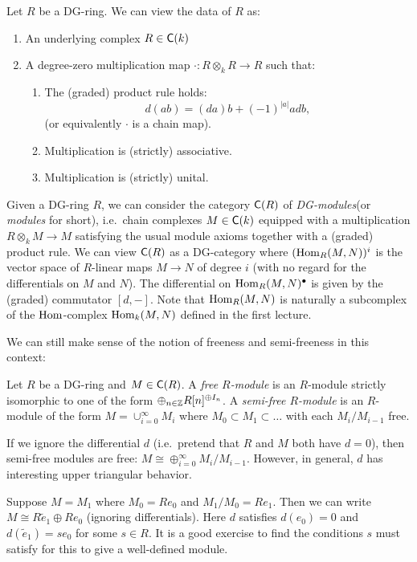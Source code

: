 \documentclass{amsart}
\begin{document}
Let $R$ be a DG-ring.
We can view the data of $R$ as:
\begin{enumerate}
	\item An underlying complex $R \in \mathsf{C}(k)$
	\item A degree-zero multiplication map $\cdot: R \otimes_k R \to R$ such that:
	\begin{enumerate}
		\item The (graded) product rule holds:
		\[
			d(ab) = (da) b + (-1)^{|a|} a db,
		\]
		(or equivalently $\cdot$ is a chain map).
		\item Multiplication is (strictly) associative.
		\item Multiplication is (strictly) unital.
	\end{enumerate}
\end{enumerate}

Given a DG-ring $R$, we can consider the category $\mathsf{C}(R)$ of \emph{DG-modules}(or \emph{modules} for short), i.e.\ chain complexes $M \in \mathsf{C}(k)$ equipped with a multiplication $R \otimes_k M \to M$ satisfying the usual module axioms together with a (graded) product rule.
We can view $\mathsf{C}(R)$ as a DG-category where $(\operatorname{Hom}_R(M, N))^i$ is the vector space of $R$-linear maps $M \to N$ of degree $i$ (with no regard for the differentials on $M$ and $N$).
The differential on $\operatorname{Hom}_R(M, N)^\bullet$ is given by the (graded) commutator $[d, -]$.
Note that $\operatorname{Hom}_R(M, N)$ is naturally a subcomplex of the $\operatorname{Hom}$-complex $\operatorname{Hom}_k(M, N)$ defined in the first lecture.

We can still make sense of the notion of freeness and semi-freeness in this context:

\begin{dfn}
	Let $R$ be a DG-ring and $M \in \mathsf{C}(R)$.
	A \emph{free $R$-module} is an $R$-module strictly isomorphic to one of the form $\oplus_{n \in \mathbb{Z}} R[n]^{\oplus I_n}$.
	A \emph{semi-free $R$-module} is an $R$-module of the form $M = \cup_{i=0}^\infty M_i$ where $M_0 \subset M_1 \subset \dots$ with each $M_i / M_{i-1}$ free.
\end{dfn}

If we ignore the differential $d$ (i.e.\ pretend that $R$ and $M$ both have $d = 0$), then semi-free modules are free: $M \cong \oplus_{i=0}^\infty M_i / M_{i-1}$.
However, in general, $d$ has interesting upper triangular behavior.

\begin{ex}
	Suppose $M = M_1$ where $M_0 = R e_0$ and $M_1 / M_0 = R e_1$.
	Then we can write $M \cong R \tilde{e}_1 \oplus R e_0$ (ignoring differentials).
	Here $d$ satisfies $d(e_0) = 0$ and $d(\tilde{e}_1) = s e_0$ for some $s \in R$.
	It is a good exercise to find the conditions $s$ must satisfy for this to give a well-defined module.
\end{ex}
\end{document}
